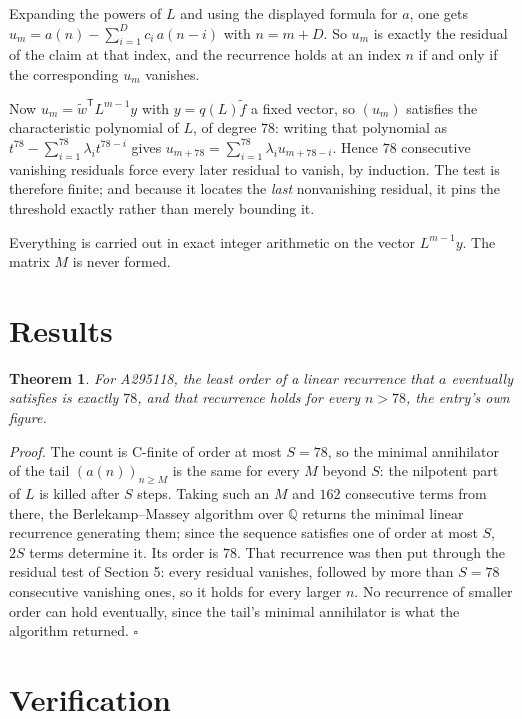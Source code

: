 \documentclass[11pt]{article}
\newtheorem{theorem}{Theorem}
\theoremstyle{definition}
\begin{document}
Expanding the powers of $L$ and using the displayed formula for $a$, one gets $u_m = a(n) - \sum_{i=1}^{D} c_i\,a(n-i)$ with $n = m + D$. So $u_m$ is exactly the residual of the claim at that index, and the recurrence holds at an index $n$ if and only if the corresponding $u_m$ vanishes.

Now $u_m = \tilde w^{\mathsf T} L^{m-1} y$ with $y = q(L)\tilde f$ a fixed vector, so $(u_m)$ satisfies the characteristic polynomial of $L$, of degree $78$: writing that polynomial as $t^{78} - \sum_{i=1}^{78} \lambda_i t^{78-i}$ gives $u_{m+78} = \sum_{i=1}^{78} \lambda_i u_{m+78-i}$. Hence $78$ consecutive vanishing residuals force every later residual to vanish, by induction. The test is therefore finite; and because it locates the {\itshape last} nonvanishing residual, it pins the threshold exactly rather than merely bounding it.

Everything is carried out in exact integer arithmetic on the vector $L^{m-1}y$. The matrix $M$ is never formed.

\section{Results}

\begin{theorem} For A295118, the least order of a linear recurrence that $a$ eventually satisfies is exactly $78$, and that recurrence holds for every $n > 78$, the entry's own figure.\end{theorem}

{\itshape Proof.} The count is C-finite of order at most $S = 78$, so the minimal annihilator of the tail $(a(n))_{n \ge M}$ is the same for every $M$ beyond $S$: the nilpotent part of $L$ is killed after $S$ steps. Taking such an $M$ and $162$ consecutive terms from there, the Berlekamp--Massey algorithm over $\mathbb{Q}$ returns the minimal linear recurrence generating them; since the sequence satisfies one of order at most $S$, $2S$ terms determine it. Its order is $78$. That recurrence was then put through the residual test of Section 5: every residual vanishes, followed by more than $S = 78$ consecutive vanishing ones, so it holds for every larger $n$. No recurrence of smaller order can hold eventually, since the tail's minimal annihilator is what the algorithm returned. $\square$

\section{Verification}
\end{document}
